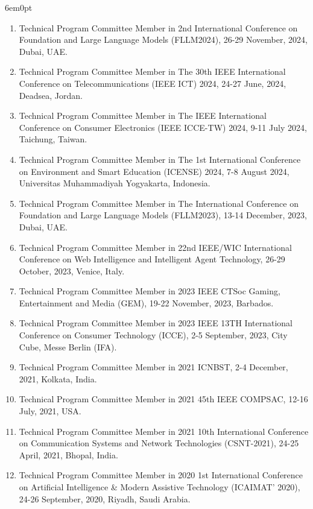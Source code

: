 \documentclass[11pt,a4paper]{moderncv}
\begin{document}
\begin{adjustwidth}{6em}{0pt}
\begin{enumerate}
		\item Technical Program Committee Member in 2nd International Conference on Foundation and Large Language Models (FLLM2024), 26-29 November, 2024, Dubai, UAE.
		
		\item Technical Program Committee Member in The 30th IEEE International Conference on Telecommunications (IEEE ICT) 2024, 24-27 June, 2024, Deadsea, Jordan.
		
		\item Technical Program Committee Member in The IEEE International Conference on Consumer Electronics (IEEE ICCE-TW) 2024, 9-11 July 2024, Taichung, Taiwan.
		
		\item Technical Program Committee Member in The 1st International Conference on Environment and Smart Education (ICENSE) 2024, 7-8 August 2024, Universitas Muhammadiyah Yogyakarta, Indonesia.
		
		\item Technical Program Committee Member in The International Conference on Foundation and Large Language Models (FLLM2023), 13-14 December, 2023, Dubai, UAE.
		
		\item Technical Program Committee Member in 22nd IEEE/WIC International Conference on Web Intelligence and Intelligent Agent Technology, 26-29 October, 2023, Venice, Italy.
		
		\item Technical Program Committee Member in 2023 IEEE CTSoc Gaming, Entertainment and Media (GEM), 19-22 November, 2023, Barbados.
		
		\item Technical Program Committee Member in 2023 IEEE 13TH International Conference on Consumer Technology (ICCE), 2-5 September, 2023, City Cube, Messe Berlin (IFA).
		
		\item Technical Program Committee Member in 2021 ICNBST, 2-4 December, 2021, Kolkata, India.
		
		\item Technical Program Committee Member in 2021 45th IEEE COMPSAC, 12-16 July, 2021, USA.
		
		\item Technical Program Committee Member in 2021 10th International Conference on Communication Systems and Network Technologies (CSNT-2021), 24-25 April, 2021, Bhopal, India.
		
		\item Technical Program Committee Member in 2020 1st International Conference on Artificial Intelligence \& Modern Assistive Technology (ICAIMAT’ 2020), 24-26 September, 2020, Riyadh, Saudi Arabia.
		

\end{enumerate}
\end{adjustwidth}
\end{document}
